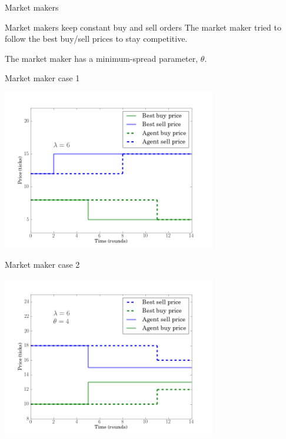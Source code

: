 \documentclass[14pt]{beamer}
\begin{document}
\begin{frame}{Market makers}
\begin{block}{Market makers keep constant buy and sell orders}
The market maker tried to follow the best buy/sell prices to stay competitive.
\end{block}
The market maker has a minimum-spread parameter, $\theta$.
\end{frame}

\begin{frame}{Market maker case 1}
\begin{center}
\includegraphics[width=0.7\textwidth]{marketmaker/a.png}
\end{center}
\end{frame}

\begin{frame}{Market maker case 2}
\begin{center}
\includegraphics[width=0.7\textwidth]{marketmaker/b.png}
\end{center}
\end{frame}
\end{document}
